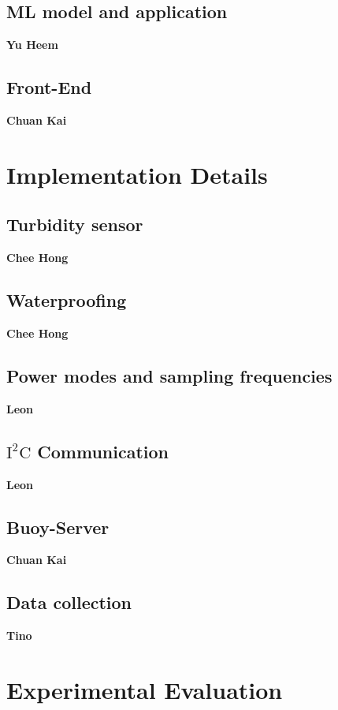 \documentclass{article}
\begin{document}
\subsection{ML model and application}

\textbf{Yu Heem}

\subsection{Front-End}

\textbf{Chuan Kai}

\section{Implementation Details}

\subsection{Turbidity sensor}

\textbf{Chee Hong}

\subsection{Waterproofing}

\textbf{Chee Hong}

\subsection{Power modes and sampling frequencies}

\textbf{Leon}

\subsection{$\text{I}^2\text{C}$ Communication}

\textbf{Leon}

\subsection{Buoy-Server}

\textbf{Chuan Kai}

\subsection{Data collection}

\textbf{Tino}

\section{Experimental Evaluation}
\end{document}
